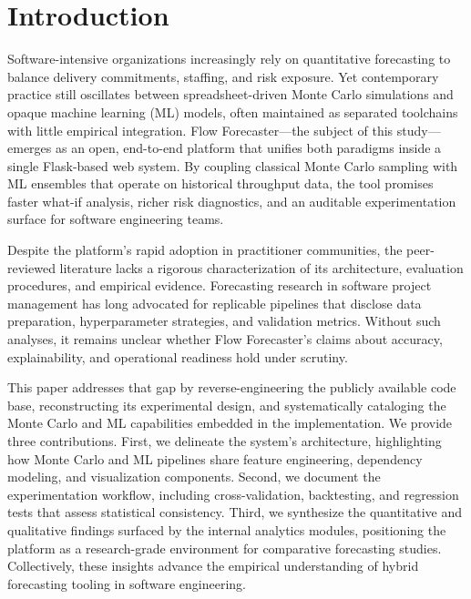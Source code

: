 \section{Introduction}
Software-intensive organizations increasingly rely on quantitative forecasting to balance delivery commitments, staffing, and risk exposure. Yet contemporary practice still oscillates between spreadsheet-driven Monte Carlo simulations and opaque machine learning (ML) models, often maintained as separated toolchains with little empirical integration. Flow Forecaster---the subject of this study---emerges as an open, end-to-end platform that unifies both paradigms inside a single Flask-based web system. By coupling classical Monte Carlo sampling with ML ensembles that operate on historical throughput data, the tool promises faster what-if analysis, richer risk diagnostics, and an auditable experimentation surface for software engineering teams.

Despite the platform's rapid adoption in practitioner communities, the peer-reviewed literature lacks a rigorous characterization of its architecture, evaluation procedures, and empirical evidence. Forecasting research in software project management has long advocated for replicable pipelines that disclose data preparation, hyperparameter strategies, and validation metrics. Without such analyses, it remains unclear whether Flow Forecaster's claims about accuracy, explainability, and operational readiness hold under scrutiny.

This paper addresses that gap by reverse-engineering the publicly available code base, reconstructing its experimental design, and systematically cataloging the Monte Carlo and ML capabilities embedded in the implementation. We provide three contributions. First, we delineate the system's architecture, highlighting how Monte Carlo and ML pipelines share feature engineering, dependency modeling, and visualization components. Second, we document the experimentation workflow, including cross-validation, backtesting, and regression tests that assess statistical consistency. Third, we synthesize the quantitative and qualitative findings surfaced by the internal analytics modules, positioning the platform as a research-grade environment for comparative forecasting studies. Collectively, these insights advance the empirical understanding of hybrid forecasting tooling in software engineering.
